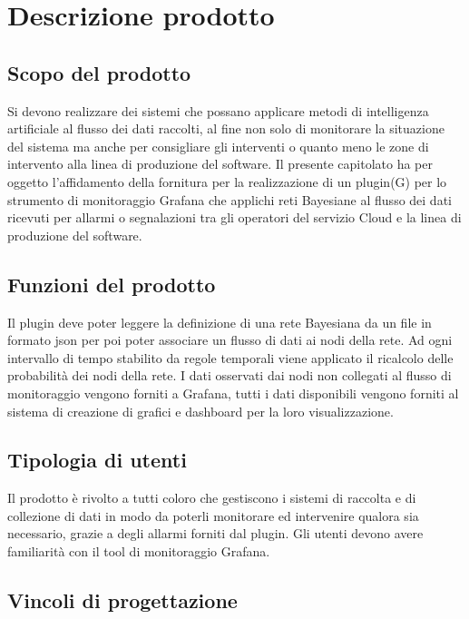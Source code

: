 \section{Descrizione prodotto}
		\subsection{Scopo del prodotto}			
Si devono realizzare dei sistemi che possano applicare metodi di intelligenza artificiale al flusso dei dati raccolti, al fine non solo di monitorare la situazione del sistema ma anche per consigliare gli interventi o quanto meno le zone di intervento alla linea di produzione del software.
Il presente capitolato ha per oggetto l'affidamento della fornitura per la
realizzazione di un plugin(G) per lo strumento di monitoraggio Grafana che
applichi reti Bayesiane al flusso dei dati ricevuti per allarmi o segnalazioni tra gli operatori del servizio Cloud e la linea di produzione del software.


		\subsection{Funzioni del prodotto}
Il plugin deve poter leggere la definizione di una rete Bayesiana da un file in formato json per poi poter associare un flusso di dati ai nodi della rete. Ad ogni intervallo di tempo stabilito da regole temporali viene applicato il ricalcolo delle probabilità dei nodi della rete. I dati osservati dai nodi non collegati al flusso di monitoraggio vengono forniti a Grafana, tutti i dati disponibili vengono forniti al sistema di creazione di grafici e dashboard per la loro visualizzazione.


		\subsection{Tipologia di utenti}

Il prodotto è rivolto a tutti coloro che gestiscono i sistemi di raccolta e
di collezione di dati in modo da poterli monitorare ed intervenire qualora sia
necessario, grazie a degli allarmi forniti dal plugin.
Gli utenti devono avere familiarità  con il tool di monitoraggio Grafana.


		\subsection{Vincoli di progettazione}
